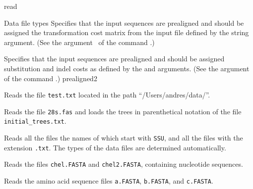 \begin{command}{read}{}
\begin{arguments}
\begin{argumentgroup}{Data file types}
            {Specifies that the input sequences are prealigned and
            should be assigned the transformation cost matrix from the 
            input file defined by the string argument. (See the argument~ 
            of the command .)}
            {}
        
            {Specifies that the input sequences are prealigned and should be
            assigned substitution and indel costs as defined by the
             and  arguments. (See the 
            argument~ 
            of the command .)}
            {prealigned2}

	\end{argumentgroup}
		
	\end{arguments}


	\begin{poyexamples}
	
            {Reads the file \texttt{test.txt} located in the path
            ``/Users/andres/data/''.}

            {Reads the file \texttt{28s.fas} and loads the trees in parenthetical notation
            of the file \texttt{initial\_trees.txt}.}

            {Reads all the files the names of which start with \texttt{SSU}, and all the
            files with the extension \texttt{.txt}. The types of the data files are determined
            automatically.}
        
            {Reads the files \texttt{chel.FASTA} and \texttt{chel2.FASTA}, containing nucleotide
            sequences.}

            {Reads the amino acid sequence files \texttt{a.FASTA}, \texttt{b.FASTA}, and
            \texttt{c.FASTA}.}


\end{poyexamples}
\end{command}
